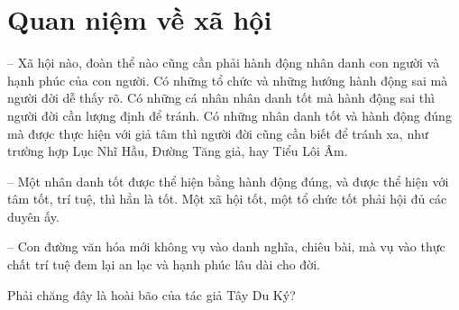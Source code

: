 \section{Quan niệm về xã hội} %
\label{sec:65_66_xa_hoi}

-- Xã hội nào, đoàn thể nào cũng cần phải hành động nhân danh con người và hạnh phúc của con người. Có những tổ chức và những hướng hành động sai mà người đời dễ thấy rõ. Có những cá nhân nhân danh tốt mà hành động sai thì người đời cần lượng định để tránh. Có những nhân danh tốt và hành động đúng mà được thực hiện với giả tâm thì người đời cũng cần biết để tránh xa, như trường hợp Lục Nhĩ Hầu, Đường Tăng giả, hay Tiểu Lôi Âm.

-- Một nhân danh tốt được thể hiện bằng hành động đúng, và được thể hiện với tâm tốt, trí tuệ, thì hẳn là tốt. Một xã hội tốt, một tổ chức tốt phải hội đủ các duyên ấy.

-- Con đường văn hóa mới không vụ vào danh nghĩa, chiêu bài, mà vụ vào thực chất trí tuệ đem lại an lạc và hạnh phúc lâu dài cho đời.

Phải chăng đây là hoài bão của tác giả Tây Du Ký?
